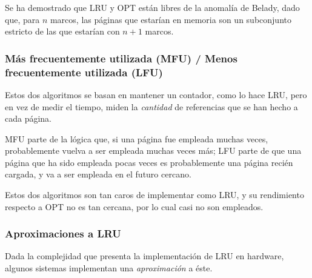 \documentclass[11pt,fleqn]{book} %
\begin{document}
Se ha demostrado que LRU y OPT están libres de la anomalía de Belady,
dado que, para $n$ marcos, las páginas que estarían en memoria son un
subconjunto estricto de las que estarían con $n+1$ marcos.
\subsubsection{Más frecuentemente utilizada (MFU) / Menos frecuentemente utilizada (LFU)}
\label{sec-5-5-3-4}


Estos dos algoritmos se basan en mantener un contador, como lo hace
LRU, pero en vez de medir el tiempo, miden la \emph{cantidad} de
referencias que se han hecho a cada página.

MFU parte de la lógica que, si una página fue empleada muchas veces,
probablemente vuelva a ser empleada muchas veces más; LFU parte de
que una página que ha sido empleada pocas veces es probablemente una
página recién cargada, y va a ser empleada en el futuro cercano.

Estos dos algoritmos son tan caros de implementar como LRU, y su
rendimiento respecto a OPT no es tan cercana, por lo cual casi no son
empleados.
\subsubsection{Aproximaciones a LRU}
\label{sec-5-5-3-5}


Dada la complejidad que presenta la implementación de LRU en
hardware, algunos sistemas implementan una \emph{aproximación} a éste.
\end{document}
